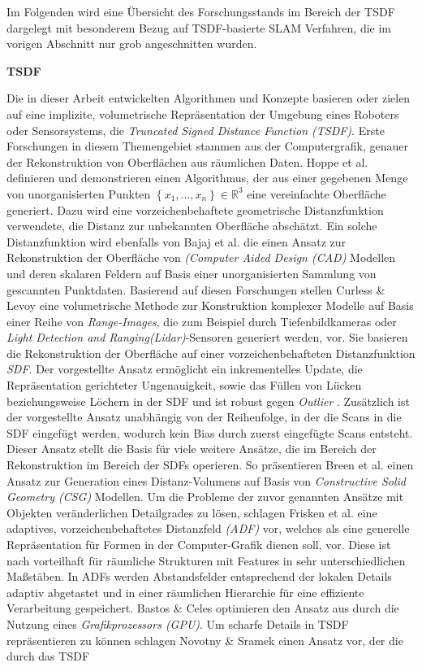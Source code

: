 Im Folgenden wird eine Übersicht des Forschungsstands im Bereich der TSDF dargelegt mit besonderem Bezug auf TSDF-basierte SLAM Verfahren, die im vorigen Abschnitt nur grob angeschnitten wurden.

\textbf{TSDF}

Die in dieser Arbeit entwickelten Algorithmen und Konzepte basieren oder zielen auf eine implizite, volumetrische Repräsentation der Umgebung eines Roboters oder Sensorsystems, die \emph{Truncated Signed Distance Function (TSDF)}. Erste Forschungen in diesem Themengebiet stammen aus der Computergrafik, genauer der Rekonstruktion von Oberflächen aus räumlichen Daten. Hoppe et al. definieren und demonstrieren einen Algorithmus, der aus einer gegebenen Menge von unorganisierten Punkten $\left\lbrace x_1, ..., x_n \right\rbrace \in \mathbb{R}^3$ eine vereinfachte Oberfläche generiert. Dazu wird eine vorzeichenbehaftete geometrische Distanzfunktion verwendete, die Distanz zur unbekannten Oberfläche abschätzt. Ein solche Distanzfunktion wird ebenfalls von Bajaj et al. \cite{bajaj1995automatic} die einen Ansatz zur Rekonstruktion der Oberfläche von \emph{(Computer Aided Design (CAD)} Modellen und deren skalaren Feldern auf Basis einer unorganisierten Sammlung von gescannten Punktdaten. Basierend auf diesen Forschungen stellen Curless \& Levoy \cite{curless1996volumetric} eine volumetrische Methode zur Konstruktion komplexer Modelle auf Basis einer Reihe von \emph{Range-Images}, die zum Beispiel durch Tiefenbildkameras oder \emph{Light Detection and Ranging(Lidar)}-Sensoren generiert werden, vor. Sie basieren die Rekonstruktion der Oberfläche auf einer vorzeichenbehafteten Distanzfunktion \emph{SDF}. Der vorgestellte Ansatz ermöglicht ein inkrementelles Update, die Repräsentation gerichteter Ungenauigkeit, sowie das Füllen von Lücken beziehungsweise Löchern in der SDF und ist robust gegen \emph{Outlier} \cite{curless1996volumetric}. Zusätzlich ist der vorgestellte Ansatz unabhängig von der Reihenfolge, in der die Scans in die SDF eingefügt werden, wodurch kein Bias durch zuerst eingefügte Scans entsteht. Dieser Ansatz stellt die Basis für viele weitere Ansätze, die im Bereich der Rekonstruktion im Bereich der SDFs operieren. So präsentieren Breen et al. \cite{breen19983d} einen Ansatz zur Generation eines Distanz-Volumens auf Basis von \emph{Constructive Solid Geometry (CSG)} Modellen. Um die Probleme der zuvor genannten Ansätze mit Objekten veränderlichen Detailgrades zu lösen, schlagen Frisken et al. \cite{frisken2000adaptively} eine adaptives, vorzeichenbehaftetes Distanzfeld \emph{(ADF)} vor, welches als eine generelle Repräsentation für Formen in der Computer-Grafik dienen soll, vor. Diese ist nach \cite{frisken2000adaptively} vorteilhaft für räumliche Strukturen mit Features in sehr unterschiedlichen Maßstäben. In ADFs werden Abstandsfelder entsprechend der lokalen Details adaptiv abgetastet und in einer räumlichen Hierarchie für eine effiziente Verarbeitung gespeichert. Bastos \& Celes optimieren den Ansatz aus \cite{frisken2000adaptively} durch die Nutzung eines \emph{Grafikprozessors (GPU)}. Um scharfe Details in TSDF repräsentieren zu können schlagen Novotny \& Sramek \cite{novotny2005representation} einen Ansatz vor, der die durch das TSDF 